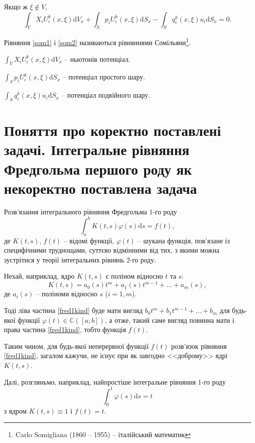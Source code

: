 \documentclass[14pt,twoside]{extreport}
\theoremstyle{mystyle}
\numberwithin{equation}{chapter}
\newcommand{\cab}{\mathbb{C}([a; b])}
\begin{document}
Якщо ж $\xi \notin V$,
\begin{equation}\label{som2}
\int_{V} X_{i}U_i^k (x, \xi) \mathrm{d}V_x + \displaystyle\int_{S} p_{i} U_i^k (x, \xi)\mathrm{d}S_x - \displaystyle\int_{S} q_i^k (x, \xi) u_{i} \mathrm{d}S_x=0.
\end{equation}

Рівняння \eqref{som1} і \eqref{som2} називаються рівняннями Сомільяни\footnote{Carlo Somigliana (1860 -- 1955) -- італійський математик}.

$\displaystyle\int_{V} X_{i}U_i^k (x, \xi) \mathrm{d}V_x$ -- ньютонів потенціал.

$\displaystyle\int_{S} p_{i} U_i^k (x, \xi)\mathrm{d}S_x$ -- потенціал простого шару.

$\displaystyle\int_{S} q_i^k (x, \xi) u_{i} \mathrm{d}S_x$ -- потенціал подвійного шару.

\chapter{Поняття про коректно поставлені задачі. Інтегральне рівняння Фредгольма першого роду як некоректно поставлена задача}\label{fred1sec}

Розв'язання інтегрального рівняння Фредгольма 1-го роду
\begin{equation}\label{fred1kind}
\int_{a}^{b} K(t, s) \varphi(s)\mathrm{d}s = f(t),
\end{equation}
де $K(t, s)$, $f(t)$ -- відомі функції, $\varphi(t)$ -- шукана функція, пов'язане із специфічними труднощами, суттєво відмінними від тих, з якими можна зустрітися у теорії інтегральних рівнянь 2-го роду.

Нехай, наприклад, ядро $K(t, s)$ є поліном відносно $t$ та $s$:
\[
K(t, s) = a_0(s) t^m + a_1(s)t^{m-1} + \ldots + a_m(s),
\]
де $a_i(s)$ -- поліноми відносно $s$ ($i = \overline{1, m}$).

Тоді ліва частина \eqref{fred1kind} буде мати вигляд $b_0 t^m + b_1t^{m-1} + \ldots  + b_m$ для будь-якої функції $\varphi(t) \in \cab$, а отже, такий саме вигляд повинна мати і права частина \eqref{fred1kind}, тобто функція $f(t)$.

Таким чином, для будь-якої неперервної функції $f(t)$ розв'язок рівняння \eqref{fred1kind}, загалом кажучи, не існує при як завгодно <<доброму>> ядрі $K(t, s)$.

Далі, розгляньмо, наприклад, найпростіше інтегральне рівняння 1-го роду
\[
\int_{0}^{1} \varphi(s) \mathrm{d}s = t
\]
з ядром $K(t, s) \equiv 1$ і $f(t) = t$.
\end{document}
